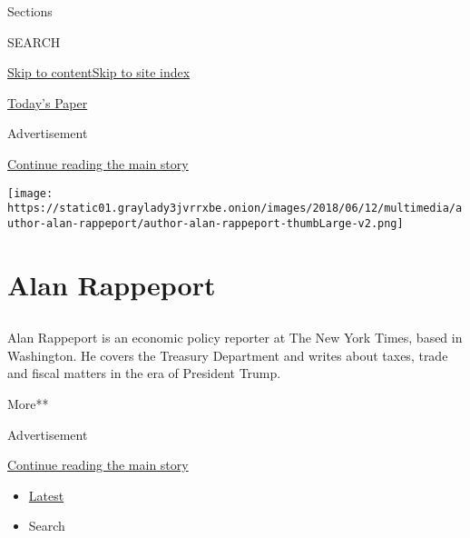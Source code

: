 Sections

SEARCH

\protect\hyperlink{site-content}{Skip to
content}\protect\hyperlink{site-index}{Skip to site index}

\href{https://myaccount.nytimes3xbfgragh.onion/auth/login?response_type=cookie\&client_id=vi}{}

\href{https://www.nytimes3xbfgragh.onion/section/todayspaper}{Today's
Paper}

Advertisement

\protect\hyperlink{after-top}{Continue reading the main story}

\texttt{[image: https://static01.graylady3jvrrxbe.onion/images/2018/06/12/multimedia/author-alan-rappeport/author-alan-rappeport-thumbLarge-v2.png]}

\hypertarget{alan-rappeport}{%
\section{Alan Rappeport}\label{alan-rappeport}}

\subsection{}

Alan Rappeport is an economic policy reporter at The New York Times,
based in Washington. He covers the Treasury Department and writes about
taxes, trade and fiscal matters in the era of President Trump.

More**

Advertisement

\protect\hyperlink{after-mid1}{Continue reading the main story}

\begin{itemize}
\tightlist
\item
  \protect\hyperlink{stream-panel}{Latest}
\item
  Search
\end{itemize}

